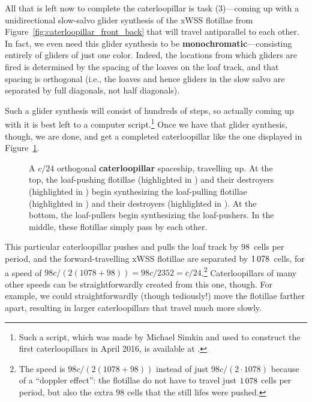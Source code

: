 All that is left now to complete the caterloopillar is task (3)---coming up with a unidirectional slow-salvo glider synthesis of the xWSS flotillae from Figure~\ref{fig:caterloopillar_front_back} that will travel antiparallel to each other. In fact, we even need this glider synthesis to be \textbf{monochromatic}---consisting entirely of gliders of just one color. Indeed, the locations from which gliders are fired is determined by the spacing of the loaves on the loaf track, and that spacing is orthogonal (i.e., the loaves and hence gliders in the slow salvo are separated by full diagonals, not half diagonals).

Such a glider synthesis will consist of hundreds of steps, so actually coming up with it is best left to a computer script.\footnote{Such a script, which was made by Michael Simkin and used to construct the first caterloopillars in April 2016, is available at .} Once we have that glider synthesis, though, we are done, and get a completed caterloopillar like the one displayed in Figure~\ref{fig:caterloopillar}.

\begin{figure}[!htbp]
	\centering
	\caption{A $c/24$ orthogonal \textbf{caterloopillar} spaceship, travelling up. At the top, the loaf-pushing flotillae (highlighted in ) and their destroyers (highlighted in ) begin synthesizing the loaf-pulling flotillae (highlighted in ) and their destroyers (highlighted in ). At the bottom, the loaf-pullers begin synthesizing the loaf-pushers. In the middle, these flotillae simply pass by each other.}\label{fig:caterloopillar}
\end{figure}

This particular caterloopillar pushes and pulls the loaf track by $98$~cells per period, and the forward-travelling xWSS flotillae are separated by $1{\,}078$~cells, for a speed of $98c/(2(1078 + 98)) = 98c/2352 = c/24$.\footnote{The speed is $98c/(2(1078 + 98))$ instead of just $98c/(2 \cdot 1078)$ because of a ``doppler effect'': the flotillae do not have to travel just $1{\,}078$ cells per period, but also the extra $98$ cells that the still lifes were pushed.} Caterloopillars of many other speeds can be straightforwardly created from this one, though. For example, we could straightforwardly (though tediously!) move the flotillae farther apart, resulting in larger caterloopillars that travel much more slowly.

